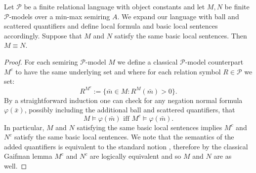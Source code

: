 \documentclass{lmcs} %
\newcommand{\?}{\ensuremath{\mkern0.4\thinmuskip}}
\let\phi=\varphi
\newcommand{\CP}{\mathcal{P}}
\begin{document}
\begin{cor}
    Let $\CP$ be a finite relational language with object constants and let $M,N$ be finite $\CP$-models over a min-max semiring $A$. We expand our language with ball and scattered quantifiers and define local formula and basic local sentences accordingly. Suppose that $M$ and $N$ satisfy the same basic local sentences. Then $M\equiv N$. 
\end{cor}
\begin{proof}
    For each semiring $\CP$-model $M$ we define a classical $\CP$-model counterpart $M^c$ to have the same underlying set and where for each relation symbol $R\in\CP$ we set:\[R^{M^c}:=\{\bar{m}\in M:R^M(\bar{m})>0\}.\]
    By a straightforward induction one can check for any negation normal formula $\phi(\bar{x})$, possibly including the additional ball and scattered quantifiers, that \[M\models\phi(\bar{m})\text{ iff }M^c\models\phi(\bar{m}).\]
    In particular, $M$ and $N$ satisfying the same basic local sentences implies $M^c$ and $N^c$ satisfy the same basic local sentences. We note that the semantics of the added quantifiers is equivalent to the standard notion \cite[Definition 4.1]{BiziereGradelNaaf23:Localitysemiring},  therefore by the classical Gaifman lemma $M^c$ and $N^c$ are logically equivalent and so $M$ and $N$ are as well. 
\end{proof}
\end{document}
